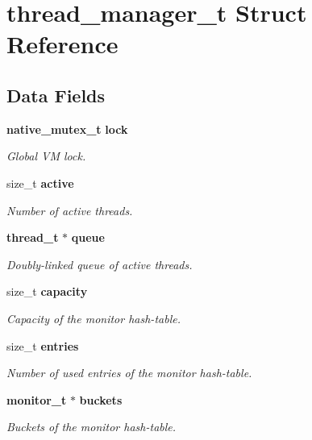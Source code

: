 \section{thread\_\-manager\_\-t Struct Reference}
\label{structthread__manager__t}
\subsection*{Data Fields}
\begin{DoxyCompactItemize}
\item 
{\bf native\_\-mutex\_\-t} {\bf lock}\label{structthread__manager__t_a7980c5f4018fe77bb4cd84b993cb4ca8}

\begin{DoxyCompactList}\small\item\em Global VM lock. \item\end{DoxyCompactList}\item 
size\_\-t {\bf active}\label{structthread__manager__t_abdd23f645ebbc19e4381add4d5a1e799}

\begin{DoxyCompactList}\small\item\em Number of active threads. \item\end{DoxyCompactList}\item 
{\bf thread\_\-t} $\ast$ {\bf queue}\label{structthread__manager__t_af5dfdda0d90cc8c34a9a4705f355a5b8}

\begin{DoxyCompactList}\small\item\em Doubly-\/linked queue of active threads. \item\end{DoxyCompactList}\item 
size\_\-t {\bf capacity}\label{structthread__manager__t_aacd1bc3723aae565a5d31585465f6f90}

\begin{DoxyCompactList}\small\item\em Capacity of the monitor hash-\/table. \item\end{DoxyCompactList}\item 
size\_\-t {\bf entries}\label{structthread__manager__t_ae896e4fb0f1d3960512e2ef5ff8726cd}

\begin{DoxyCompactList}\small\item\em Number of used entries of the monitor hash-\/table. \item\end{DoxyCompactList}\item 
{\bf monitor\_\-t} $\ast$ {\bf buckets}\label{structthread__manager__t_a75ba33310537551018a5355097b14a46}

\begin{DoxyCompactList}\small\item\em Buckets of the monitor hash-\/table. \item\end{DoxyCompactList}\end{DoxyCompactItemize}


